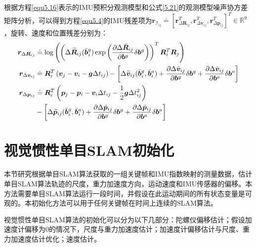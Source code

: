 根据方程\eqref{equ5.16}表示的IMU预积分观测模型和公式\eqref{5.21}的观测模型噪声协方差矩阵分析，可以得到方程\eqref{equ5.4}的IMU残差项为$\boldsymbol{r}_{\mathcal{I}_{ij}} \doteq \left[ \boldsymbol{r}_{\Delta \boldsymbol{R}_{ij}}^T,\boldsymbol{r}_{\Delta \boldsymbol{v}_{ij}}^T, \boldsymbol{r}_{\Delta \boldsymbol{p}_{ij}}^T \right]^T \in \mathds{R}^9 $，旋转、速度和位置残差分别为：
\begin{equation}
\label{equ5.27}
\begin{aligned}
\boldsymbol{r}_{\Delta \boldsymbol{R}_{ij}} & \doteq \log \left( \left( \Delta \widetilde{\boldsymbol{R}}_{ij}(\bar{\boldsymbol{b}}_i^g) \exp \left( { \partial \Delta \bar{\boldsymbol{R}}_{ij} \over \partial \boldsymbol{b}^g } \delta \boldsymbol{b}^g \right) \right)^T \boldsymbol{R}_i^T \boldsymbol{R}_j  \right) 
\\
\boldsymbol{r}_{\Delta \boldsymbol{v}_{ij}} & \doteq \boldsymbol{R}_i^T \left(\boldsymbol{v}_j-\boldsymbol{v}_i-\boldsymbol{g}\Delta t_{ij} \right) - \left[ \Delta \widetilde{\boldsymbol{v}}_{ij}(\bar{\boldsymbol{b}}_i^g,\bar{\boldsymbol{b}}_i^a) + { \partial \Delta \bar{\boldsymbol{v}}_{ij} \over \partial \boldsymbol{b}^g } \delta \boldsymbol{b}^g + { \partial \Delta \bar{\boldsymbol{v}}_{ij} \over \partial \boldsymbol{b}^a } \delta \boldsymbol{b}^a  \right] 
\\
\boldsymbol{r}_{\Delta \boldsymbol{p}_{ij}} & \doteq \boldsymbol{R}_i^T \left( \boldsymbol{p}_j-\boldsymbol{p}_i-\boldsymbol{v}_i \Delta t_{ij} -{1 \over 2} \boldsymbol{g} \Delta t_{ij}^2 \right) \\
& - \left[ \Delta \widetilde{\boldsymbol{p}}_{ij}(\bar{\boldsymbol{b}}_i^g,\bar{\boldsymbol{b}}_i^a) + { \partial \Delta \bar{\boldsymbol{p}}_{ij} \over \partial \boldsymbol{b}^g } \delta \boldsymbol{b}^g + { \partial \Delta \bar{\boldsymbol{p}}_{ij} \over \partial \boldsymbol{b}^a } \delta \boldsymbol{b}^a  \right]
\end{aligned}
\end{equation}


\section{视觉惯性单目SLAM初始化}
本节研究根据单目SLAM算法获取的一组关键帧和IMU指数映射的测量数据，估计单目SLAM算法轨迹的尺度，重力加速度方向，运动速度和IMU传感器的偏移。本方法需要单目SLAM算法运行一段时间，并假设在此运动期间的所有状态变量是可观的。本初始化方法可以用于任何关键帧在时间上连续的SLAM算法。

视觉惯性单目SLAM算法的初始化可以分为以下几部分：陀螺仪偏移估计；假设加速度计偏移为0的情况下，尺度与重力加速度估计；加速度计偏移估计与尺度、重力加速度估计优化；速度估计。

